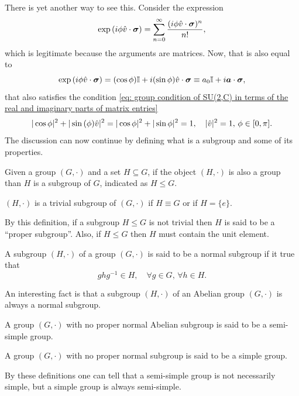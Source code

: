 There is yet another way to see this. Consider the expression
\begin{equation}
    \exp{(i\phi\hat{v}\cdot\bm{\sigma})} = \sum_{n = 0}^\infty \frac{(i\phi \hat{v}\cdot\bm{\sigma})^n}{n!},
\end{equation}
which is legitimate because the arguments are matrices. Now, that is also equal to 
\begin{equation}
    \exp{(i\phi\hat{v}\cdot\bm{\sigma})} = (\cos{\phi})\mathbb{I} + i(\sin{\phi})\hat{v}\cdot\bm{\sigma} \equiv a_0\mathbb{I} + i\bm{a}\cdot\bm{\sigma},
\end{equation}
that also satisfies the condition \eqref{eq: group condition of SU(2,C) in terms of the real and imaginary parts of matrix entries}
\begin{equation}
    |\cos{\phi}|^2 + |\sin{(\phi)}\hat{v}|^2 = |\cos{\phi}|^2 + |\sin{\phi}|^2 = 1,\quad |\hat{v}|^2 = 1,\,\phi\in[0,\pi].
\end{equation}
The discussion can now continue by defining what is a subgroup and some of its properties. 
\begin{defn}[subgroup]
    Given a group $(G,\cdot)$ and a set $H \subseteq G$, if the object $(H,\cdot)$ is also a group than $H$ is a subgroup of $G$, indicated as $H \le G$.
\end{defn}
\begin{defn}
    $(H,\cdot)$ is a trivial subgroup of $(G,\cdot)$ if $H \equiv G$ or if $H = \{e\}$. 
\end{defn} 
By this definition, if a subgroup $H \le G$ is not trivial then $H$ is said to be a ``proper subgroup''. Also, if $H \le G$ then $H$ must contain the unit element.
\begin{defn}
    A subgroup $(H,\cdot)$ of a group $(G,\cdot)$ is said to be a normal subgroup if it true that
    \begin{equation}
        ghg^{-1} \in H,\quad \forall g\in G,\, \forall h \in H.
    \end{equation}
\end{defn}
An interesting fact is that a subgroup $(H,\cdot)$ of an Abelian group $(G,\cdot)$ is always a normal subgroup. 
\begin{defn}
    A group $(G,\cdot)$ with no proper normal Abelian subgroup is said to be a semi-simple group.
\end{defn}
\begin{defn}
    A group $(G,\cdot)$ with no proper normal subgroup is said to be a simple group.
\end{defn}
By these definitions one can tell that a semi-simple group is not necessarily simple, but a simple group is always semi-simple. 

